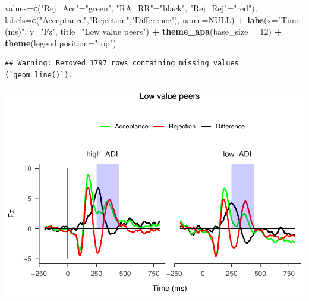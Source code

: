 \documentclass[
]{article}
\newenvironment{Shaded}{\begin{snugshade}}{\end{snugshade}}
\newcommand{\AttributeTok}[1]{\textcolor[rgb]{0.13,0.29,0.53}{#1}}
\newcommand{\ConstantTok}[1]{\textcolor[rgb]{0.56,0.35,0.01}{#1}}
\newcommand{\DecValTok}[1]{\textcolor[rgb]{0.00,0.00,0.81}{#1}}
\newcommand{\FunctionTok}[1]{\textcolor[rgb]{0.13,0.29,0.53}{\textbf{#1}}}
\newcommand{\NormalTok}[1]{#1}
\newcommand{\OtherTok}[1]{\textcolor[rgb]{0.56,0.35,0.01}{#1}}
\newcommand{\SpecialCharTok}[1]{\textcolor[rgb]{0.81,0.36,0.00}{\textbf{#1}}}
\newcommand{\StringTok}[1]{\textcolor[rgb]{0.31,0.60,0.02}{#1}}
\begin{document}
\begin{Shaded}
\begin{Highlighting}[]
                     \AttributeTok{values=}\FunctionTok{c}\NormalTok{(}\StringTok{"Rej\_Acc"}\OtherTok{=}\StringTok{"green"}\NormalTok{, }\StringTok{"RA\_RR"}\OtherTok{=}\StringTok{"black"}\NormalTok{, }\StringTok{"Rej\_Rej"}\OtherTok{=}\StringTok{"red"}\NormalTok{), }
                     \AttributeTok{labels=}\FunctionTok{c}\NormalTok{(}\StringTok{"Acceptance"}\NormalTok{,}\StringTok{"Rejection"}\NormalTok{,}\StringTok{"Difference"}\NormalTok{), }\AttributeTok{name=}\ConstantTok{NULL}\NormalTok{) }\SpecialCharTok{+}
  \FunctionTok{labs}\NormalTok{(}\AttributeTok{x=}\StringTok{"Time (ms)"}\NormalTok{, }\AttributeTok{y=}\StringTok{"Fz"}\NormalTok{, }\AttributeTok{title=}\StringTok{"Low value peers"}\NormalTok{) }\SpecialCharTok{+}
  \FunctionTok{theme\_apa}\NormalTok{(}\AttributeTok{base\_size =} \DecValTok{12}\NormalTok{) }\SpecialCharTok{+} \FunctionTok{theme}\NormalTok{(}\AttributeTok{legend.position=}\StringTok{"top"}\NormalTok{)}
\end{Highlighting}
\end{Shaded}

\begin{verbatim}
## Warning: Removed 1797 rows containing missing values (`geom_line()`).
\end{verbatim}

\includegraphics{do01_BUDS_files/figure-latex/unnamed-chunk-10-2.pdf}
\end{document}
